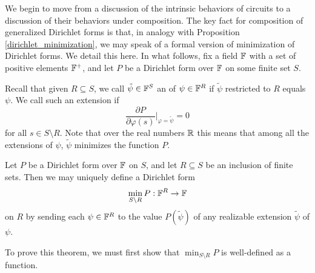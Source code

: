We begin to move from a discussion of the intrinsic behaviors of circuits to a
discussion of their behaviors under composition. The key fact for composition of
generalized Dirichlet forms is that, in analogy with Proposition
\ref{dirichlet_minimization}, we may speak of a formal version of minimization
of Dirichlet forms. We detail this here.  In what follows, fix a field ${\mathbb F}$ with a 
set of positive elements ${\mathbb F}^+$, and let $P$ be a Dirichlet form over ${\mathbb F}$ on 
some finite set $S$. 

Recall that given $R \subseteq S$, we
call $\tilde\psi \in {\mathbb F}^S$ an  of $\psi \in {\mathbb F}^R$ if
$\tilde\psi$ restricted to $R$ equals $\psi$.   We call such an
extension  if 
\[
    \frac{\partial P}{\partial \varphi(s)}\bigg\vert_{\varphi = \tilde\psi} = 0
  \]
for all $s \in S \setminus R$.  Note that over the real numbers ${\mathbb{R}}$ this means
that among all the extensions of $\psi$, $\tilde\psi$ minimizes the function $P$.

\begin{theorem} \label{thm:dirichletminimization}
  Let $P$ be a Dirichlet form over ${\mathbb F}$ on $S$, and let $R \subseteq S$ be an
  inclusion of finite sets. Then we may uniquely define a Dirichlet form
  \[\min_{S \setminus R}P: {\mathbb F}^R \to {\mathbb F}\] 
   on $R$ by sending each $\psi \in {\mathbb F}^R$ to
  the value $P(\tilde\psi)$ of any realizable extension $\tilde\psi$ of $\psi$.
\end{theorem}


To prove this theorem, we must first show that $\min_{S \setminus R} P$ is well-defined as a function.

